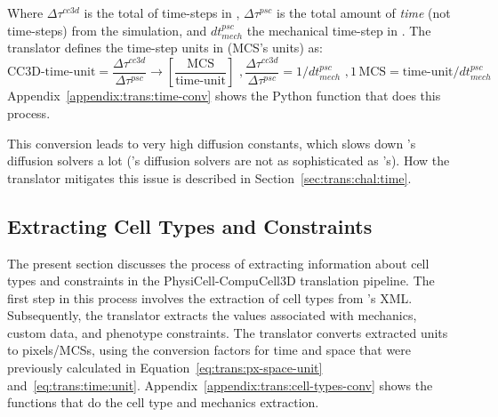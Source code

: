 \noindent Where $\Delta\tau^{cc3d}$ is the total of time-steps in \ccd, $\Delta\tau^{psc}$ is the total amount of \textit{time} (not time-steps) from the \pscs simulation, and $dt^{psc}_{mech}$ the mechanical time-step in \psc.
The translator defines the time-step units in \ccds (MCS's units) as:
\begin{subequations}\label{eq:trans:time:unit}
    \begin{equation}\label{eq:trans:time:unit:1}
        \text{CC3D-time-unit} = \frac{\Delta\tau^{cc3d}}{\Delta\tau^{psc}} \rightarrow \left[\frac{\text{MCS}}{\text{time-unit}}\right]\,\,,
    \end{equation}
    \begin{equation}\label{eq:trans:time:unit:2}
        \frac{\Delta\tau^{cc3d}}{\Delta\tau^{psc}} = 1/dt^{psc}_{mech}\,\,,
    \end{equation}
    \begin{equation}\label{eq:trans:time:unit:3}
        1\,\text{MCS} = \text{time-unit} / dt^{psc}_{mech}
    \end{equation}
\end{subequations}
\noindent Appendix~\ref{appendix:trans:time-conv} shows the Python function that does this process.

This conversion leads to very high diffusion constants, which slows down \ccd's diffusion solvers a lot (\ccd's diffusion solvers are not as sophisticated as \psc's). How the translator mitigates this issue is described in Section~\ref{sec:trans:chal:time}.


\subsection{Extracting Cell Types and Constraints}\label{sec:trans:impl:constraints}


The present section discusses the process of extracting information about cell types and constraints in the PhysiCell-CompuCell3D translation pipeline. The first step in this process involves the extraction of cell types from \psc's XML. Subsequently, the translator extracts the values associated with mechanics, custom data, and phenotype constraints. The translator converts extracted units to pixels/MCSs, using the conversion factors for time and space that were previously calculated in Equation~\ref{eq:trans:px-space-unit} and~\ref{eq:trans:time:unit}. Appendix~\ref{appendix:trans:cell-types-conv} shows the functions that do the cell type and mechanics extraction.

